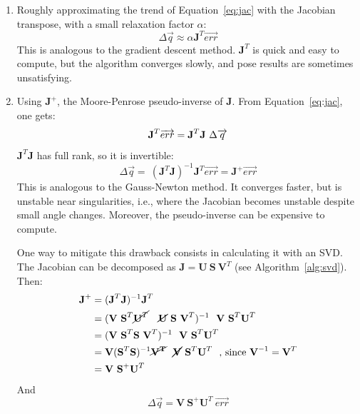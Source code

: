 \begin{enumerate}[itemsep=0em, topsep=0em, leftmargin=*]
    \item Roughly approximating the trend of Equation~\ref{eq:jac} with the Jacobian transpose, with a small relaxation factor $\alpha$:
    \begin{equation}
      \Delta \overrightarrow{q} \approx \alpha \textbf{J}^T \overrightarrow{err}
    \end{equation} 
    This is analogous to the gradient descent method. $\textbf{J}^T$ is quick and easy to compute, but the algorithm converges slowly, and pose results are sometimes unsatisfying.
    
    \item Using $\textbf{J}^+$, the Moore-Penrose pseudo-inverse of \textbf{J}. From Equation~\ref{eq:jac}, one gets:
    \begin{equation}
        \textbf{J}^T \overrightarrow{err} = \textbf{J}^T \textbf{J} \ \Delta \overrightarrow{q}\\
    \end{equation}
    $\textbf{J}^T \textbf{J}$ has full rank, so it is invertible:
    \begin{equation}\label{eq:pseudoinv}
        \Delta \overrightarrow{q} = \ (\textbf{J}^T \textbf{J})^{-1} \textbf{J}^T \overrightarrow{err} = \textbf{J}^+ \overrightarrow{err} 
    \end{equation} 
    This is analogous to the Gauss-Newton method. It converges faster, but is unstable near singularities, i.e., where the Jacobian becomes unstable despite small angle changes. Moreover, the pseudo-inverse can be expensive to compute. 
    
    One way to mitigate this drawback consists in calculating it with an SVD. The Jacobian can be decomposed as $\textbf{J} = \textbf{U} \ \textbf{S} \ \textbf{V}^T$ (see Algorithm~\ref{alg:svd}). Then:
    \begin{equation}
          \begin{aligned}
          \textbf{J}^+
          & = (\textbf{J}^T \textbf{J})^{-1} \textbf{J}^T \\
          & = (\textbf{V} \ \textbf{S}^T \cancel{\textbf{U}^T} \ \ \
          \cancel{\textbf{U}} \ \textbf{S} \ \textbf{V}^T)^{-1} \ \  
          \textbf{V} \ \textbf{S}^T \textbf{U}^T \ \ \\
          & = (\textbf{V} \ \textbf{S}^T\textbf{S}\ \textbf{V}^T)^{-1} \ \  
          \textbf{V} \ \textbf{S}^T \textbf{U}^T \ \ \\
          & = \textbf{V} (\textbf{S}^T\textbf{S})^{-1} \cancel{\mathbf{V^T}} \ \  
          \cancel{\textbf{V}} \ \textbf{S}^T \textbf{U}^T \ \ \text{, since }\textbf{V}^{-1}=\textbf{V}^T\\
          & = \textbf{V} \ \textbf{S}^{+} \textbf{U}^T \ \ \\
        \end{aligned}
      \end{equation}
      And 
      \begin{equation}
        \Delta \overrightarrow{q} =  \textbf{V} \ \textbf{S}^{+} \textbf{U}^T \ \overrightarrow{err} 
      \end{equation}


\end{enumerate}
